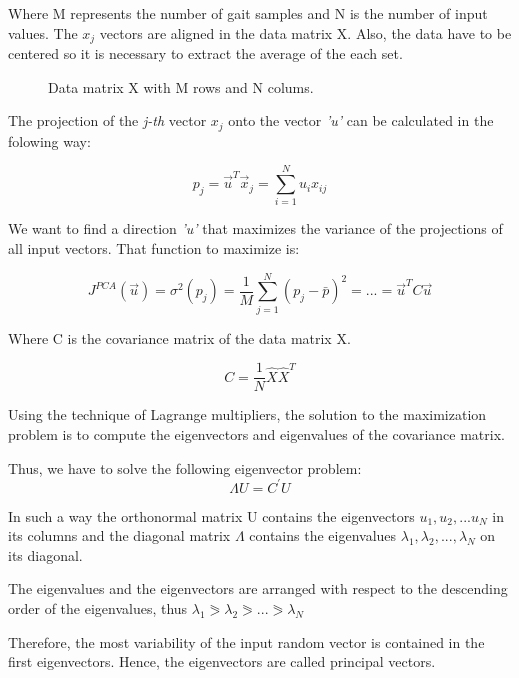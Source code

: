 Where M represents the number of gait samples and N is the number of input values. The $ x_{j} $ vectors are aligned in the data matrix X. Also, the data have to be centered so it is necessary to extract the average of the each set.
\begin{figure}[H]
	\centering
	\caption{Data matrix X with M rows and N colums.}
	\label{fig:matrixPCA}
\end{figure}

The projection of the \textit{j-th} vector $ x_{j} $ onto the vector \textit{'u'} can be calculated in the folowing way:

\begin{equation}
	\label{projections}
	p_{j}=\overrightarrow{u}^{T}\overrightarrow{x}_{j}=\sum_{i=1}^{N}u_{i}x_{ij}	
\end{equation}

We want to find a direction \textit{'u'} that maximizes the variance of the projections of all input vectors. That function to maximize is:

\begin{equation}
	\label{maxfunction}
	J^{PCA}(\overrightarrow{u})=\sigma^{2}(p_{j})=\dfrac{1}{M}\sum_{j=1}^{N}(p_{j}-\bar{p})^{2}=...=\overrightarrow{u}^{T}C\overrightarrow{u}	
\end{equation}

Where C is the covariance matrix of the data matrix X.

$$C=\dfrac{1}{N}\hat{X}\hat{X}^{T}$$

Using the technique of Lagrange multipliers, the solution to the maximization problem is to compute the eigenvectors and eigenvalues of the covariance matrix.

Thus, we have to solve the following eigenvector problem:
\begin{equation}
	\label{eigenproblem}
	\Lambda U=C^{'} U
\end{equation}

In such a way the orthonormal matrix U contains the eigenvectors $u_{1}, u_{2},...u_{N}$ in its columns and the diagonal matrix $\Lambda$ contains the eigenvalues $\lambda_{1}, \lambda_{2},...,\lambda_{N}$ on its diagonal.

The eigenvalues and the eigenvectors are arranged with respect to the descending order of the eigenvalues, thus $\lambda_{1}\eqslantgtr\lambda_{2}\eqslantgtr...\eqslantgtr\lambda_{N}$

Therefore, the most variability of the input random vector is contained in the first eigenvectors. Hence, the eigenvectors are called principal vectors.

